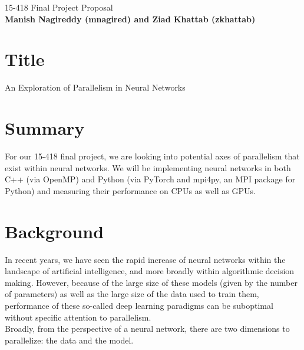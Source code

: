 \documentclass{article}
\begin{document}
\begin{center}

\Large{15-418 Final Project Proposal} \\
\vspace{1em}
\normalsize\textbf{Manish Nagireddy (mnagired) and Ziad Khattab (zkhattab)} \\
\vspace{1em}

\end{center}

\section*{Title}

An Exploration of Parallelism in Neural Networks

\section*{Summary}

For our 15-418 final project, we are looking into potential axes of parallelism that exist within neural networks. We will be implementing neural networks in both C++ (via OpenMP) and Python (via PyTorch and mpi4py, an MPI package for Python) and measuring their performance on CPUs as well as GPUs.

\section*{Background}

In recent years, we have seen the rapid increase of neural networks within the landscape of artificial intelligence, and more broadly within algorithmic decision making. However, because of the large size of these models (given by the number of parameters) as well as the large size of the data used to train them, performance of these so-called deep learning paradigms can be suboptimal without specific attention to parallelism. \\

Broadly, from the perspective of a neural network, there are two dimensions to parallelize: the data and the model.
\end{document}
